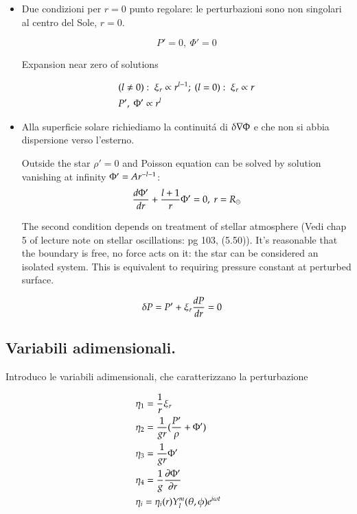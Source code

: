 \documentclass[oneside,12pt,fleqn]{memoir}
\begin{document}
\begin{itemize}
\item Due condizioni per $r=0$ punto regolare: le perturbazioni sono non singolari al centro del Sole, $r=0$.

\begin{equation*}
P'=0,\ \Phi'=0
\end{equation*}

Expansion near zero of solutions

\begin{align*}
&(l\neq0):\ \xi_r\propto r\expy{l-1};\ (l=0):\ \xi_r\propto r\\
&P',\ \Phi'\propto r^l
\end{align*}

\item Alla superficie solare richiediamo la continuit\'a di $\Lvar{\nabla\Phi}$ e che non si abbia dispersione verso l'esterno.

Outside the star $\rho'=0$ and Poisson equation can be solved by solution vanishing at infinity $\Phi'=Ar\expy{-l-1}$:
\begin{equation*}
\TDy{r}{\Phi'}+\frac{l+1}{r}\Phi'=0,\ r=\rsun{}    
\end{equation*}

The second condition depends on treatment of stellar atmosphere (Vedi chap 5 of lecture note on stellar oscillations: pg 103, (5.50)). It's reasonable that the boundary is free, no force acts on it: the star can be considered an isolated system. This is equivalent to requiring pressure constant at perturbed surface.

\begin{align*}
&\Lvar{P}=P'+\xi_r\TDy{r}{P}=0
\end{align*}

\end{itemize}

\subsection{Variabili adimensionali.}

Introduco le variabili adimensionali, che caratterizzano la perturbazione

\begin{align*}
&\eta_1=\frac{1}{r}\xi_r\\
&\eta_2=\frac{1}{gr}(\frac{P'}{\rho}+\Phi')\\
&\eta_3=\frac{1}{gr}\Phi'\\
&\eta_4=\frac{1}{g}\PDy{r}{\Phi'}\\
&\eta_i=\eta_i(r)Y_l^m(\theta,\phi)\exp{i\omega t}
\end{align*}
\end{document}
